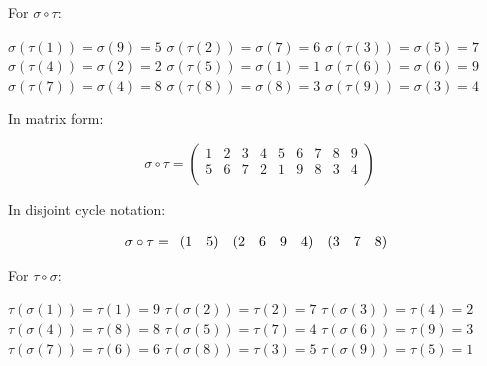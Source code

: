 \documentclass[a4paper]{article}
\begin{document}
\begin{myparindent}{0pt}
For $\sigma \circ \tau$:

$\sigma(\tau(1)) = \sigma(9) = 5$ \newline
$\sigma(\tau(2)) = \sigma(7) = 6$ \newline
$\sigma(\tau(3)) = \sigma(5) = 7$ \newline
$\sigma(\tau(4)) = \sigma(2) = 2$ \newline
$\sigma(\tau(5)) = \sigma(1) = 1$ \newline
$\sigma(\tau(6)) = \sigma(6) = 9$ \newline
$\sigma(\tau(7)) = \sigma(4) = 8$ \newline
$\sigma(\tau(8)) = \sigma(8) = 3$ \newline
$\sigma(\tau(9)) = \sigma(3) = 4$ \newline

In matrix form:

\[
    \sigma \circ \tau =
    \begin{pmatrix}
        1 & 2 & 3 & 4 & 5 & 6 & 7 & 8 & 9 \\
        5 & 6 & 7 & 2 & 1 & 9 & 8 & 3 & 4 \\
    \end{pmatrix}
\]

In disjoint cycle notation:

\[
    \noindent \sigma \circ \tau = \begin{array}{rr} (1 & 5) \end{array}
    \noindent \begin{array}{rrrrr} (2 & 6 & 9 & 4) \end{array}
    \noindent \begin{array}{rrr} (3 & 7 & 8) \end{array}
\]


For $\tau \circ \sigma$:

$\tau(\sigma(1)) = \tau(1) = 9$ \newline
$\tau(\sigma(2)) = \tau(2) = 7$ \newline
$\tau(\sigma(3)) = \tau(4) = 2$ \newline
$\tau(\sigma(4)) = \tau(8) = 8$ \newline
$\tau(\sigma(5)) = \tau(7) = 4$ \newline
$\tau(\sigma(6)) = \tau(9) = 3$ \newline
$\tau(\sigma(7)) = \tau(6) = 6$ \newline
$\tau(\sigma(8)) = \tau(3) = 5$ \newline
$\tau(\sigma(9)) = \tau(5) = 1$ \newline


\end{myparindent}
\end{document}
